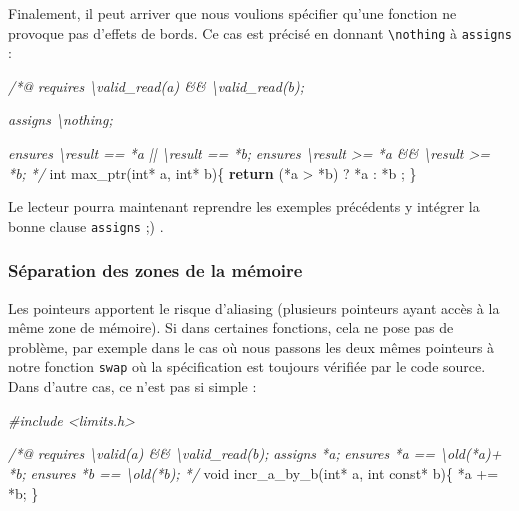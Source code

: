 \documentclass[12pt,francais,]{scrbook}
\newenvironment{Shaded}{}{}
\newcommand{\KeywordTok}[1]{\textcolor[rgb]{0.00,0.44,0.13}{\textbf{{#1}}}}
\newcommand{\DataTypeTok}[1]{\textcolor[rgb]{0.56,0.13,0.00}{{#1}}}
\newcommand{\CommentTok}[1]{\textcolor[rgb]{0.38,0.63,0.69}{\textit{{#1}}}}
\newcommand{\NormalTok}[1]{{#1}}
\begin{document}
Finalement, il peut arriver que nous voulions spécifier qu'une fonction
ne provoque pas d'effets de bords. Ce cas est précisé en donnant
\texttt{\textbackslash{}nothing} à \texttt{assigns} :

\begin{footnotesize}\begin{Shaded}
\begin{Highlighting}[]
\CommentTok{/*@}
\CommentTok{  requires \textbackslash{}valid_read(a) && \textbackslash{}valid_read(b);}

\CommentTok{  assigns  \textbackslash{}nothing;}

\CommentTok{  ensures \textbackslash{}result == *a || \textbackslash{}result == *b;}
\CommentTok{  ensures \textbackslash{}result >= *a && \textbackslash{}result >= *b;}
\CommentTok{*/}
\DataTypeTok{int} \NormalTok{max_ptr(}\DataTypeTok{int}\NormalTok{* a, }\DataTypeTok{int}\NormalTok{* b)\{}
  \KeywordTok{return} \NormalTok{(*a > *b) ? *a : *b ;}
\NormalTok{\}}
\end{Highlighting}
\end{Shaded}\end{footnotesize}

Le lecteur pourra maintenant reprendre les exemples précédents y
intégrer la bonne clause \texttt{assigns} ;) .

\subsubsection{Séparation des zones de la
mémoire}\label{suxe9paration-des-zones-de-la-muxe9moire}

Les pointeurs apportent le risque d'aliasing (plusieurs pointeurs ayant
accès à la même zone de mémoire). Si dans certaines fonctions, cela ne
pose pas de problème, par exemple dans le cas où nous passons les deux
mêmes pointeurs à notre fonction \texttt{swap} où la spécification est
toujours vérifiée par le code source. Dans d'autre cas, ce n'est pas si
simple :

\begin{footnotesize}\begin{Shaded}
\begin{Highlighting}[]
\CommentTok{#include <limits.h>}

\CommentTok{/*@}
\CommentTok{  requires \textbackslash{}valid(a) && \textbackslash{}valid_read(b);}
\CommentTok{  assigns  *a;}
\CommentTok{  ensures  *a == \textbackslash{}old(*a)+ *b;}
\CommentTok{  ensures  *b == \textbackslash{}old(*b);}
\CommentTok{*/}
\DataTypeTok{void} \NormalTok{incr_a_by_b(}\DataTypeTok{int}\NormalTok{* a, }\DataTypeTok{int} \DataTypeTok{const}\NormalTok{* b)\{}
  \NormalTok{*a += *b;}
\NormalTok{\}}
\end{Highlighting}
\end{Shaded}\end{footnotesize}
\end{document}
